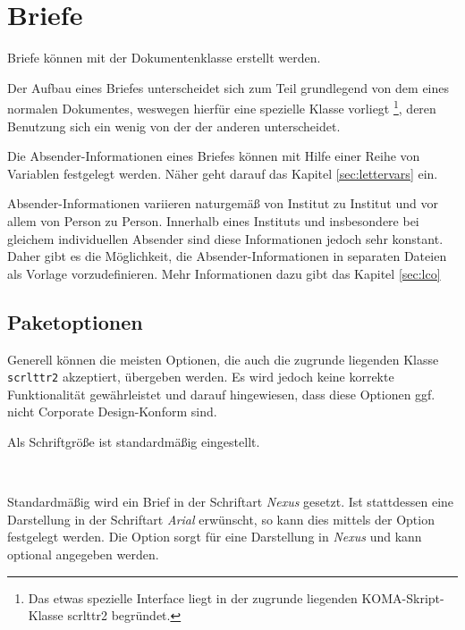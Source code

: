 \chapter{Briefe}

Briefe können mit der Dokumentenklasse  erstellt
werden.

Der Aufbau eines Briefes unterscheidet sich zum Teil grundlegend von dem eines
normalen Dokumentes, weswegen hierfür eine spezielle Klasse vorliegt%
\footnote{Das etwas spezielle Interface liegt in der zugrunde liegenden 
KOMA-Skript-Klasse scrlttr2 begründet.}, deren Benutzung sich ein wenig von
der der anderen unterscheidet.

Die Absender-Informationen eines Briefes können mit Hilfe einer Reihe von
Variablen festgelegt werden. Näher geht darauf das Kapitel \ref{sec:lettervars}
ein.

Absender-Informationen variieren naturgemäß von Institut zu Institut
und vor allem von Person zu Person. Innerhalb eines Instituts und insbesondere
bei gleichem individuellen Absender sind diese Informationen jedoch sehr
konstant. Daher gibt es die Möglichkeit, die Absender-Informationen in
separaten Dateien als Vorlage vorzudefinieren. Mehr Informationen dazu gibt
das Kapitel \ref{sec:lco}

\section{Paketoptionen}

Generell können die meisten Optionen, die auch die zugrunde liegenden Klasse
\texttt{scrlttr2} akzeptiert, übergeben werden. Es wird jedoch keine korrekte
Funktionalität gewährleistet und darauf hingewiesen, dass diese Optionen
ggf. nicht Corporate Design-Konform sind.

Als Schriftgröße ist standardmäßig \PValue{10pt} eingestellt.

\begin{Declaration}
  \\
\end{Declaration}

Standardmäßig wird ein Brief in der Schriftart \emph{Nexus} gesetzt.
Ist stattdessen eine Darstellung in der Schriftart \emph{Arial} erwünscht,
so kann dies mittels der Option  festgelegt werden.
Die Option  sorgt für eine Darstellung in \emph{Nexus} und
kann optional angegeben werden.

\begin{Declaration}
\end{Declaration}

